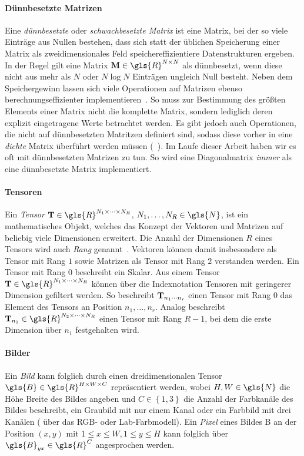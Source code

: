 \paragraph{Dünnbesetzte Matrizen}

Eine \emph{dünnbesetzte} oder \emph{schwachbesetzte Matrix} ist eine Matrix, bei der so viele Einträge aus Nullen bestehen, dass sich statt der üblichen Speicherung einer Matrix als zweidimensionales Feld speichereffizientiere Datenstrukturen ergeben.
In der Regel gilt eine Matrix $\ma{M}\in \gls{R}^{N \times N}$ als dünnbesetzt, wenn diese nicht aus mehr als $N$ oder $N \log N$ Einträgen ungleich Null besteht.
Neben dem Speichergewinn lassen sich viele Operationen auf Matrizen ebenso berechnungseffizienter implementieren~\cite{Saad}.
So muss \zB{} zur Bestimmung des größten Elements einer Matrix nicht die komplette Matrix, sondern lediglich deren explizit eingetragene Werte betrachtet werden.
Es gibt jedoch auch Operationen, die nicht auf dünnbesetzten Matritzen definiert sind, sodass diese vorher in eine \emph{dichte} Matrix überführt werden müssen (\vgl{}~\cite{Saad}).
Im Laufe dieser Arbeit haben wir es oft mit dünnbesetzten Matrizen zu tun.
So wird \zB{} eine Diagonalmatrix \emph{immer} als eine dünnbesetzte Matrix implementiert.

\paragraph{Tensoren}

Ein \emph{Tensor} $\ma{T} \in \gls{R}^{N_1 \times \cdots \times N_R}$, $N_1, \ldots, N_R \in \gls{N}$, ist ein mathematisches Objekt, welches das Konzept der Vektoren und Matrizen auf beliebig viele Dimensionen erweitert.
Die Anzahl der Dimensionen $R$ eines Tensors wird auch \emph{Rang} genannt~\cite{linear}.
Vektoren können damit insbesondere als Tensor mit Rang $1$ sowie Matrizen als Tensor mit Rang $2$ verstanden werden.
Ein Tensor mit Rang $0$ beschreibt ein Skalar.
Aus einem Tensor $\ma{T} \in \gls{R}^{N_1 \times \cdots \times N_R}$ können über die Indexnotation Tensoren mit geringerer Dimension gefiltert werden.
So beschreibt $\mathbf{T}_{n_1 \cdots n_r}$ einen Tensor mit Rang $0$ \bzw{} das Element des Tensors an Position $n_1, \ldots, n_r$.
Analog beschreibt \zB{} $\ma{T}_{n_1} \in \gls{R}^{N_2 \times \cdots \times N_R}$ einen Tensor mit Rang $R-1$, bei dem die erste Dimension über $n_1$ festgehalten wird.

\paragraph{Bilder}

Ein \emph{Bild} kann folglich durch einen dreidimensionalen Tensor $\gls{B} \in \gls{R}^{H \times W \times C}$ repräsentiert werden, wobei $H, W \in \gls{N}$ die Höhe \bzw{} Breite des Bildes angeben und $C \in \left\{1, 3\right\}$ die Anzahl der Farbkanäle des Bildes beschreibt, \dhe{} ein Graubild mit nur einem Kanal oder ein Farbbild mit drei Kanälen (\zB{} über das RGB- oder Lab-Farbmodell).
Ein \emph{Pixel} eines Bildes \gls{B} an der Position $\left(x, y\right)$ mit $1 \leq x \leq W, 1 \leq y \leq H$ kann folglich über $\gls{B}_{yx} \in \gls{R}^C$ angesprochen werden.
